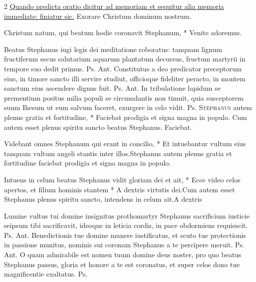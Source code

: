 \begin{multicols*}{2}
\newline \ul{Quando predicta oratio dicitur ad memoriam et sequitur alia memoria immediate: finiatur sic.} Exorare Christum dominum nostrum.
\begin{invitatory}
{Christum natum, qui beatum hodie coronavit Stephanum, * Venite adoremus.}
\end{invitatory}
 Beatus Stephanus iugi legis dei meditatione roboratus: tanquam lignum fructiferum secus salutarium aquarum plantatum decursus, fructum martyrii in tempore suo dedit primus. {\color{Red} Ps.}  {\color{Red} Ant.} Constitutus a deo predicator preceptorum eius, in timore sancto illi servire studiut, officioque fideliter peracto, in montem sanctum eius ascendere dignus fuit. {\color{Red} Ps.}  {\color{Red} Ant.} In tribulatione lapidum se prementium positus milia populi se circumdantis non timuit, quia susceptorem suum Ihesum ut eum salvum faceret, exurgere in celo vidit. {\color{Red} Ps.}  \R
\lettrine[lines=2]{\zallmancaps \color{Blue} S}{tephanus} \hypertarget{stepanus-autem-plenus}{\label{stepanus-autem-plenus}} autem plenus gratia et fortitudine, * Faciebat prodigia et signa magna in populo. \V Cum autem esset plenus spiritu sancto beatus Stephanus. Faciebat.
\begin{responsory}
{Videbant omnes Stephanum qui erant in concilio, * Et intuebantur vultum eius tanquam vultum angeli stantis inter illos.}{Stephanus autem plenus gratia et fortitudine faciebat prodigia et signa magna in populo.}
\end{responsory}%
\begin{responsory-final}
{Intuens in celum beatus Stephanus vidit gloriam dei et ait, * Ecce video celos apertos, et filium hominis stantem * A dextris virtutis dei.}{Cum autem esset Stephanus plenus spiritu sancto, intendens in celum ait.}{A dextris}
\end{responsory-final}%
 Lumine vultus tui domine insignitus prothomartyr Stephanus sacrificium iusticie seipsum tibi sacrificavit, ideoque in leticia cordis, in pace obdormiens requiescit. {\color{Red} Ps.}  {\color{Red} Ant.} Benedictionis tue domine munere iustificatus, et scuto tue protectionis in passione munitus, nominis sui coronam Stephanus a te percipere meruit. {\color{Red} Ps.}  {\color{Red} Ant.} O quam admirabile est nomen tuum domine deus noster, pro quo beatus Stephanus passus, gloria et honore a te est coronatus, et super celos dono tue magnificentie exaltatus. {\color{Red} Ps.}  \V 

\end{multicols*}
